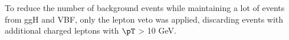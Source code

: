 To reduce the number of background events while maintaining a lot of events from ggH and VBF, only the lepton veto was applied, discarding events with additional charged leptons with $\pT$ > 10 GeV.%

